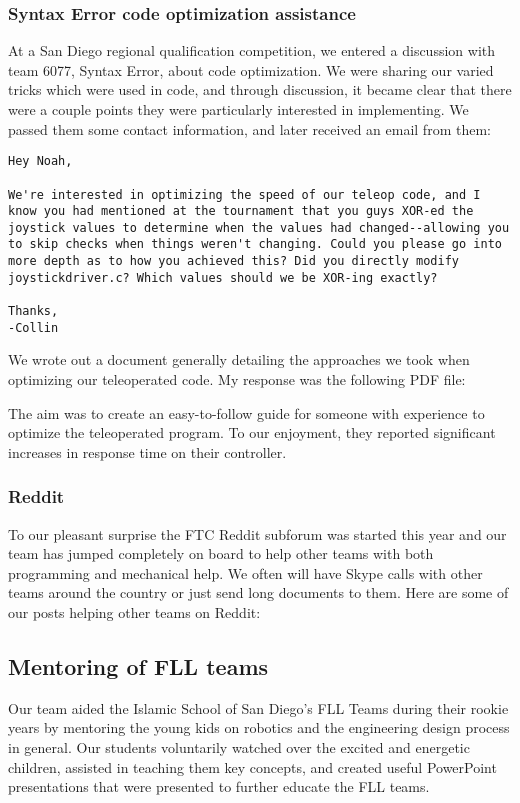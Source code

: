 \subsubsection{Syntax Error code optimization assistance}

At a San Diego regional qualification competition, we entered a discussion with team 6077, Syntax Error, about code optimization. We were sharing our varied tricks which were used in code, and through discussion, it became clear that there were a couple points they were particularly interested in implementing. We passed them some contact information, and later received an email from them:

\begin{lstlisting}
Hey Noah,

We're interested in optimizing the speed of our teleop code, and I know you had mentioned at the tournament that you guys XOR-ed the joystick values to determine when the values had changed--allowing you to skip checks when things weren't changing. Could you please go into more depth as to how you achieved this? Did you directly modify joystickdriver.c? Which values should we be XOR-ing exactly?

Thanks,
-Collin 
\end{lstlisting}

We wrote out a document generally detailing the approaches we took when optimizing our teleoperated code. My response was the following PDF file:



The aim was to create an easy-to-follow guide for someone with experience to optimize the teleoperated program. To our enjoyment, they reported significant increases in response time on their controller.

\subsubsection{Reddit}
To our pleasant surprise the FTC Reddit subforum was started this year and our team has jumped completely on board to help other teams with both programming and mechanical help. We often will have Skype calls with other teams around the country or just send long documents to them. Here are some of our posts helping other teams on Reddit:



\subsection{Mentoring of FLL teams}
Our team aided the Islamic School of San Diego's FLL Teams during their rookie years by mentoring the young kids on robotics and the engineering design process in general. Our students voluntarily watched over the excited and energetic children, assisted in teaching them key concepts, and created useful PowerPoint presentations that were presented to further educate the FLL teams.

